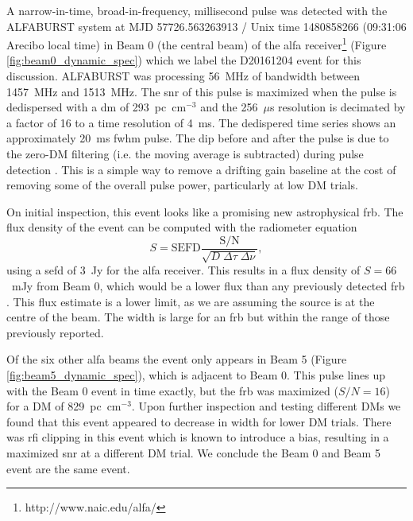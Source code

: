 \documentclass[a4paper,fleqn,usenatbib]{mnras}
\begin{document}
A narrow-in-time, broad-in-frequency, millisecond pulse was detected with the
ALFABURST system at MJD 57726.563263913 / Unix time 1480858266 (09:31:06 Arecibo
local time) in Beam 0 (the central beam) of the \gls{alfa}
receiver\footnote{http://www.naic.edu/alfa/} (Figure
\ref{fig:beam0_dynamic_spec}) which we label the D20161204 event for this
discussion. ALFABURST was processing 56~MHz of bandwidth between 1457~MHz and
1513~MHz. The \gls{snr} of this pulse is maximized when the pulse is dedispersed
with a \gls{dm} of 293~pc~cm$^{-3}$ and the 256~$\mu$s resolution is decimated
by a factor of 16 to a time resolution of 4~ms. The dedispered time series shows
an approximately 20~ms \gls{fwhm} pulse.  The dip before and after the pulse is
due to the zero-DM filtering (i.e. the moving average is subtracted) during
pulse detection \citep{2009MNRAS.395..410E}. This is a simple way to remove a
drifting gain baseline at the cost of removing some of the overall pulse power,
particularly at low DM trials.


On initial inspection, this event looks like a promising new astrophysical
\gls{frb}. The flux density of the event can be computed with the radiometer
equation
%
$$
S = \textrm{SEFD} \frac{\textrm{S/N}}{\sqrt{D \; \Delta \tau \;
\Delta \nu}},
$$
%
using a \gls{sefd} of 3~Jy for the \gls{alfa} receiver. This results in a flux
density of $S = 66$~mJy from Beam 0, which would be a lower flux than any
previously detected \gls{frb} \citep{2016PASA...33...45P}. This flux estimate is
a lower limit, as we are assuming the source is at the centre of the beam. The
width is large for an \gls{frb} but within the range of those previously
reported.

Of the six other \gls{alfa} beams the event only appears in Beam 5 (Figure
\ref{fig:beam5_dynamic_spec}), which is adjacent to Beam 0.  This pulse lines up
with the Beam 0 event in time exactly, but the \gls{frb} was maximized
($S/N=16$) for a DM of 829~pc~cm$^{-3}$. Upon further inspection and testing
different DMs we found that this event appeared to decrease in width for lower
DM trials. There was \gls{rfi} clipping in this event which is known to
introduce a bias, resulting in a maximized \gls{snr} at a different DM trial.
We conclude the Beam 0 and Beam 5 event are the same event.
\end{document}
